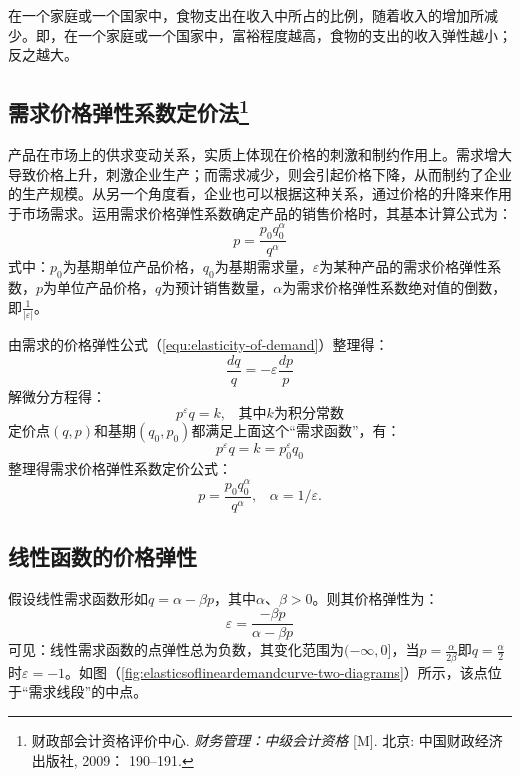 \begin{Definition}[恩格尔定律]
在一个家庭或一个国家中，食物支出在收入中所占的比例，随着收入的增加所减少。即，在一个家庭或一个国家中，富裕程度越高，食物的支出的收入弹性越小；反之越大。
\end{Definition}

\subsection{需求价格弹性系数定价法\footnote{财政部会计资格评价中心. {\it 财务管理：中级会计资格} [M]. 北京: 中国财政经济出版社, 2009： 190--191.}}
\label{subsec:pricing-based-on-the-demand-price-elasticity}

产品在市场上的供求变动关系，实质上体现在价格的刺激和制约作用上。需求增大导致价格上升，刺激企业生产；而需求减少，则会引起价格下降，从而制约了企业的生产规模。从另一个角度看，企业也可以根据这种关系，通过价格的升降来作用于市场需求。运用需求价格弹性系数确定产品的销售价格时，其基本计算公式为：
\begin{equation}
p = \frac{{{p_0}q_0^\alpha }}{{{q^\alpha }}}
\label{equ:pricing-based-on-the-demand-price-elasticity}
\end{equation}
式中：$p_0$为基期单位产品价格，$q_0$为基期需求量，$\varepsilon$为某种产品的需求价格弹性系数，$p$为单位产品价格，$q$为预计销售数量，$\alpha$为需求价格弹性系数绝对值的倒数，即$\frac{1}{{\left| \varepsilon \right|}}$。

由需求的价格弹性公式（\ref{equ:elasticity-of-demand}）整理得：
\[\frac{{dq}}{q} =  - \varepsilon\frac{{dp}}{p}\]
解微分方程得：
\[{p^{\varepsilon}}q = k \text{,}\quad \text{其中$k$为积分常数}\]
定价点$(q , p)$和基期$(q_0 , p_0)$都满足上面这个“需求函数”，有：
\[{p^{\varepsilon}}q = k =p_0^{\varepsilon}{q_0}\]
整理得需求价格弹性系数定价公式：
\[p = \frac{{p_0}q_0^\alpha}{q^\alpha } \text{,}\quad \alpha = 1/{\varepsilon} \text{.}\]


\subsection{线性函数的价格弹性}

假设线性需求函数形如$q=\alpha - \beta p$，其中$\alpha$、$\beta>0$。则其价格弹性为：
\begin{equation}
\varepsilon  = \frac{{ - \beta p}}{{\alpha  - \beta p}}
\end{equation}
可见：线性需求函数的点弹性总为负数，其变化范围为$(-\infty,0]$，当$p=\frac{\alpha}{2\beta}$即$q=\frac{\alpha}{2}$时$\varepsilon=-1$。如图（\ref{fig:elasticsoflineardemandcurve-two-diagrams}）所示，该点位于“需求线段”的中点。

